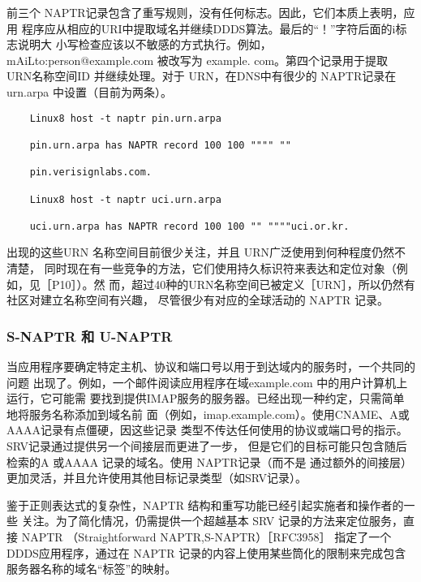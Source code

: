 前三个 NAPTR记录包含了重写规则，没有任何标志。因此，它们本质上表明，应用
程序应从相应的URI中提取域名并继续DDDS算法。最后的“！”字符后面的i标志说明大
小写检查应该以不敏感的方式执行。例如，mAiLto:person@example.com 被改写为 example.
com。第四个记录用于提取 URN名称空间ID 并继续处理。对于 URN，在DNS中有很少的
NAPTR记录在 urn.arpa 中设置（目前为两条）。

\begin{verbatim}
    Linux8 host -t naptr pin.urn.arpa
    
    pin.urn.arpa has NAPTR record 100 100 """" ""
    
    pin.verisignlabs.com.
    
    Linux8 host -t naptr uci.urn.arpa
    
    uci.urn.arpa has NAPTR record 100 100 "" """"uci.or.kr.
\end{verbatim}

出现的这些URN 名称空间目前很少关注，并且 URN广泛使用到何种程度仍然不清楚，
同时现在有一些竞争的方法，它们使用持久标识符来表达和定位对象（例如，见［P10］）。然
而，超过40种的URN名称空间已被定义［URN］，所以仍然有社区对建立名称空间有兴趣，
尽管很少有对应的全球活动的 NAPTR 记录。

\subsubsection{S-NAPTR 和 U-NAPTR}

当应用程序要确定特定主机、协议和端口号以用于到达域内的服务时，一个共同的问题
出现了。例如，一个邮件阅读应用程序在域example.com 中的用户计算机上运行，它可能需
要找到提供IMAP服务的服务器。已经出现一种约定，只需简单地将服务名称添加到域名前
面（例如，imap.example.com）。使用CNAME、A或AAAA记录有点僵硬，因这些记录
类型不传达任何使用的协议或端口号的指示。SRV记录通过提供另一个间接层而更进了一步，
但是它们的目标可能只包含随后检索的A 或AAAA 记录的域名。使用 NAPTR记录（而不是
通过额外的间接层）更加灵活，并且允许使用其他目标记录类型（如SRV记录）。

鉴于正则表达式的复杂性，NAPTR 结构和重写功能已经引起实施者和操作者的一些
关注。为了简化情况，仍需提供一个超越基本 SRV 记录的方法来定位服务，直接 NAPTR
（Straightforward NAPTR,S-NAPTR）［RFC3958］ 指定了一个DDDS应用程序，通过在
NAPTR 记录的内容上使用某些筒化的限制来完成包含服务器名称的域名“标签”的映射。

